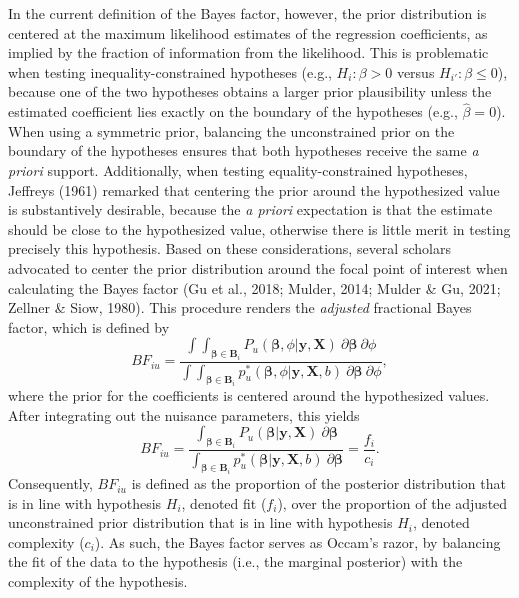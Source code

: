 \documentclass[
]{interact}
\begin{document}
In the current definition of the Bayes factor, however, the prior
distribution is centered at the maximum likelihood estimates of the
regression coefficients, as implied by the fraction of information from
the likelihood. This is problematic when testing inequality-constrained
hypotheses (e.g., \(H_i: \beta > 0\) versus \(H_{i'}: \beta \leq 0\)),
because one of the two hypotheses obtains a larger prior plausibility
unless the estimated coefficient lies exactly on the boundary of the
hypotheses (e.g., \(\hat{\beta}=0\)). When using a symmetric prior,
balancing the unconstrained prior on the boundary of the hypotheses
ensures that both hypotheses receive the same \emph{a priori} support.
Additionally, when testing equality-constrained hypotheses, Jeffreys
(1961) remarked that centering the prior around the hypothesized value
is substantively desirable, because the \emph{a priori} expectation is
that the estimate should be close to the hypothesized value, otherwise
there is little merit in testing precisely this hypothesis. Based on
these considerations, several scholars advocated to center the prior
distribution around the focal point of interest when calculating the
Bayes factor (Gu et al., 2018; Mulder, 2014; Mulder \& Gu, 2021; Zellner
\& Siow, 1980). This procedure renders the \emph{adjusted} fractional
Bayes factor, which is defined by \[
BF_{iu} = \frac{
  \int \int_{\boldsymbol{\beta} \in \boldsymbol{B}_i} P_u(\boldsymbol{\beta}, \phi | \boldsymbol{y}, \boldsymbol{X}) ~ \partial \boldsymbol{\beta} ~ \partial \phi
} {
  \int \int_{\boldsymbol{\beta} \in \boldsymbol{B}_i} p^*_u(\boldsymbol{\beta}, \phi| \boldsymbol{y}, \boldsymbol{X}, b) ~ \partial \boldsymbol{\beta} ~ \partial \phi
},
\] where the prior for the coefficients is centered around the
hypothesized values. After integrating out the nuisance parameters, this
yields \[
BF_{iu} = \frac{
  \int_{\boldsymbol{\beta} \in \boldsymbol{B}_i} P_u (\boldsymbol{\beta} | \boldsymbol{y}, \boldsymbol{X}) ~ \partial \boldsymbol{\beta}
}{
  \int_{\boldsymbol{\beta} \in \boldsymbol{B}_i} p^*_u(\boldsymbol{\beta} | \boldsymbol{y}, \boldsymbol{X}, b) ~ \partial \boldsymbol{\beta}
}
= \frac{f_i}{c_i}.
\] Consequently, \(BF_{iu}\) is defined as the proportion of the
posterior distribution that is in line with hypothesis \(H_i\), denoted
fit (\(f_i\)), over the proportion of the adjusted unconstrained prior
distribution that is in line with hypothesis \(H_i\), denoted complexity
(\(c_i\)). As such, the Bayes factor serves as Occam's razor, by
balancing the fit of the data to the hypothesis (i.e., the marginal
posterior) with the complexity of the hypothesis.
\end{document}
